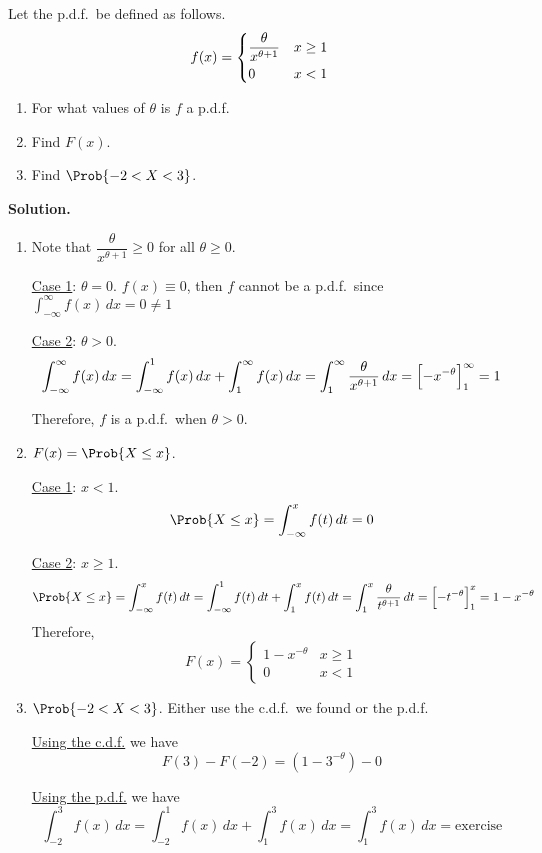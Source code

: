 \begin{Example}{}{}
    Let the p.d.f.\ be defined as follows.
    \[ f(x)=\begin{dcases}
            \frac{\theta}{x^{\theta+1}} & x\ge 1 \\
            0                           & x<1
        \end{dcases} \]
    \begin{enumerate}[label=(\roman*)]
        \item For what values of $ \theta $ is $ f $ a p.d.f.
        \item Find $ F(x) $.
        \item Find $ \Prob{-2<X<3} $.
    \end{enumerate}
    \textbf{Solution.}

    \begin{enumerate}[label=(\roman*)]
        \item Note that $ \dfrac{\theta}{x^{\theta+1}} \ge 0 $
              for all $ \theta\ge 0 $.

              \underline{Case 1}: $ \theta=0 $. $ f(x)\equiv 0 $, then $ f $
              cannot be a p.d.f.\ since $ \int_{-\infty}^{\infty} f(x)\, d{x}=0\neq 1 $

              \underline{Case 2}: $ \theta>0 $.
              \[ \int_{-\infty}^{\infty} f(x)\, d{x}=\int_{-\infty}^{1} f(x)\, d{x}
                  +\int_{1}^{\infty} f(x)\, d{x}=\int_{1}^{\infty} \frac{\theta}{x^{\theta+1}}\, d{x}
                  =\Bigl[ -x^{-\theta} \Bigr]_1^\infty=1 \]

              Therefore, $ f $ is a p.d.f.\ when $ \theta>0 $.

        \item $ F(x)=\Prob{X\le x} $.

              \underline{Case 1}: $ x<1 $.
              \[ \Prob{X\le x}=\int_{-\infty}^{x} f(t)\, d{t} =0 \]

              \underline{Case 2}:  $ x\ge 1 $.
              \[ \Prob{X\le x}=\int_{-\infty}^{x} f(t)\, d{t}
                  =\int_{-\infty}^{1} f(t)\, d{t} +\int_{1}^{x} f(t)\, d{t}
                  =\int_{1}^{x} \frac{\theta}{t^{\theta+1}} \, d{t}=\Bigl[ -t^{-\theta} \Bigr]_1^x=
                  1-x^{-\theta}  \]
              Therefore,
              \[ F(x)=\begin{cases}
                      1-x^{-\theta} & x\ge 1 \\
                      0             & x< 1
                  \end{cases} \]
        \item $ \Prob{-2<X<3} $. Either use the c.d.f.\ we found or the p.d.f.

              \underline{Using the c.d.f.} we have
              \[ F(3)-F(-2)=(1-3^{-\theta})-0 \]

              \underline{Using the p.d.f.} we have
              \[ \int_{-2}^{3} f(x)\, d{x}=
                  \int_{-2}^{1} f(x)\, d{x} +\int_{1}^{3} f(x)\, d{x}
                  =\int_{1}^{3} f(x)\, d{x}=\text{exercise} \]
    \end{enumerate}

\end{Example}
